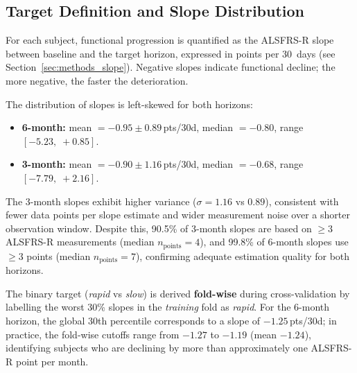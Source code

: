 \subsection{Target Definition and Slope Distribution}
\label{subsec:results_target_summary}
For each subject, functional progression is quantified as the ALSFRS-R slope between baseline and the target horizon, expressed in points per 30~days (see Section~\ref{sec:methods_slope}).
Negative slopes indicate functional decline; the more negative, the faster the deterioration.

The distribution of slopes is left-skewed for both horizons:
\begin{itemize}
  \item \textbf{6-month:} mean $= -0.95 \pm 0.89$\,pts/30d, median $= -0.80$, range $[-5.23,\; +0.85]$.
  \item \textbf{3-month:} mean $= -0.90 \pm 1.16$\,pts/30d, median $= -0.68$, range $[-7.79,\; +2.16]$.
\end{itemize}
The 3-month slopes exhibit higher variance ($\sigma = 1.16$ vs $0.89$), consistent with fewer data points per slope estimate and wider measurement noise over a shorter observation window.
Despite this, 90.5\% of 3-month slopes are based on $\geq 3$ ALSFRS-R measurements (median $n_{\text{points}} = 4$), and 99.8\% of 6-month slopes use $\geq 3$ points (median $n_{\text{points}} = 7$), confirming adequate estimation quality for both horizons.

The binary target (\textit{rapid} vs \textit{slow}) is derived \textbf{fold-wise} during cross-validation by labelling the worst 30\% slopes in the \emph{training} fold as \textit{rapid}.
For the 6-month horizon, the global 30th percentile corresponds to a slope of $-1.25$\,pts/30d; in practice, the fold-wise cutoffs range from $-1.27$ to $-1.19$ (mean $-1.24$), identifying subjects who are declining by more than approximately one ALSFRS-R point per month.

